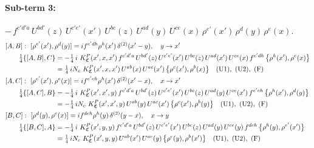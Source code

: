 \documentclass[10pt]{article}
\numberwithin{equation}{section}
\begin{document}
\paragraph{Sub-term 3:} $-\,f^{c'd'a}\,U^{bd'}(z)\,U^{c'e'}(x')\,U^{bc}(z)\,U^{ad}(y)\,U^{ce}(x)\,\rho^{e'}(x')\,\rho^{d}(y)\,\rho^{e}(x)$.
\begin{align}
&[A,B]:\ [\rho^{e'}(x'),\rho^{d}(y)]=i f^{e'dh}\rho^{h}(x')\,\delta^{(2)}(x'-y),\quad y\to x'\notag\\
&\qquad \tfrac14\{[A,B],C\}=-\tfrac14\,i\,\,K^{P}_{\mathfrak C}(x',x,x')\,f^{c'd'a}\,U^{bd'}(z)\,U^{c'e'}(x')\,U^{bc}(z)\,U^{ad}(x')\,U^{ce}(x)\,f^{e'dh}\,\big\{\rho^{h}(x'),\rho^{e}(x)\big\}\notag\\
&\qquad\phantom{\tfrac14\{[A,B],C\}}=\tfrac14\,i N_{c}\,\,K^{P}_{\mathfrak C}(x',x,x')\,U^{ab}(x)\,U^{ac}(x')\,\big\{\rho^{c}(x'),\rho^{b}(x)\big\}\quad\text{(U1)},\ \text{(U2)},\ \text{(F)}
\label{eq:GIII.VI.P-3-AB}\\
&[A,C]:\ [\rho^{e'}(x'),\rho^{e}(x)]=i f^{e'eh}\rho^{h}(x')\,\delta^{(2)}(x'-x),\quad x\to x'\notag\\
&\qquad \tfrac14\{[A,C],B\}=-\tfrac14\,i\,\,K^{P}_{\mathfrak C}(x',x',y)\,f^{c'd'a}\,U^{bd'}(z)\,U^{c'e'}(x')\,U^{bc}(z)\,U^{ad}(y)\,U^{ce}(x')\,f^{e'eh}\,\big\{\rho^{h}(x'),\rho^{d}(y)\big\}\notag\\
&\qquad\phantom{\tfrac14\{[A,C],B\}}=-\tfrac14\,i N_{c}\,\,K^{P}_{\mathfrak C}(x',x',y)\,U^{ab}(y)\,U^{ac}(x')\,\big\{\rho^{c}(x'),\rho^{b}(y)\big\}\quad\text{(U1)},\ \text{(U2)},\ \text{(F)}
\label{eq:GIII.VI.P-3-AC}\\
&[B,C]:\ [\rho^{d}(y),\rho^{e}(x)]=i f^{deh}\rho^{h}(y)\,\delta^{(2)}(y-x),\quad x\to y\notag\\
&\qquad \tfrac14\{[B,C],A\}=-\tfrac14\,i\,\,K^{P}_{\mathfrak C}(x',y,y)\,f^{c'd'a}\,U^{bd'}(z)\,U^{c'e'}(x')\,U^{bc}(z)\,U^{ad}(y)\,U^{ce}(y)\,f^{deh}\,\big\{\rho^{h}(y),\rho^{e'}(x')\big\}\notag\\
&\qquad\phantom{\tfrac14\{[B,C],A\}}=\tfrac14\,i N_{c}\,\,K^{P}_{\mathfrak C}(x',y,y)\,U^{ab}(x')\,U^{ac}(y)\,\big\{\rho^{c}(y),\rho^{b}(x')\big\}\quad\text{(U1)},\ \text{(U2)},\ \text{(F)}
\label{eq:GIII.VI.P-3-BC}
\end{align}
\end{document}
